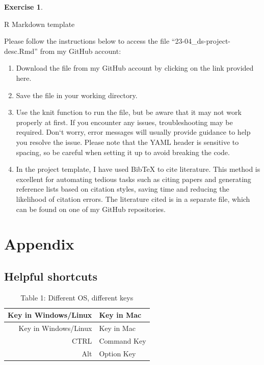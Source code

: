 \documentclass[
  12pt,
  oneside]{book}
\providecommand{\tightlist}{%
  \setlength{\itemsep}{0pt}\setlength{\parskip}{0pt}}
\theoremstyle{definition}
\theoremstyle{definition}
\theoremstyle{definition}
\newtheorem{exercise}{Exercise}[chapter]
\theoremstyle{definition}
\theoremstyle{remark}
\begin{document}
\begin{exercise}
\protect\hypertarget{exr:rmdsecond}{}\label{exr:rmdsecond}

R Markdown template

Please follow the instructions below to access the file ``23-04\_ds-project-desc.Rmd'' from my GitHub account:

\begin{enumerate}
\def\labelenumi{\arabic{enumi}.}
\tightlist
\item
  Download the file from my GitHub account by clicking on the link provided here.
\item
  Save the file in your working directory.
\item
  Use the knit function to run the file, but be aware that it may not work properly at first. If you encounter any issues, troubleshooting may be required. Don`t worry, error messages will usually provide guidance to help you resolve the issue. Please note that the YAML header is sensitive to spacing, so be careful when setting it up to avoid breaking the code.
\item
  In the project template, I have used BibTeX to cite literature. This method is excellent for automating tedious tasks such as citing papers and generating reference lists based on citation styles, saving time and reducing the likelihood of citation errors. The literature cited is in a separate file, which can be found on one of my GitHub repositories.
\end{enumerate}

\end{exercise}

\hypertarget{appendix}{%
\chapter{Appendix}\label{appendix}}

\hypertarget{helpful-shortcuts}{%
\section{Helpful shortcuts}\label{helpful-shortcuts}}

\begin{longtable}[]{@{}rl@{}}
\caption{Table 1: Different OS, different keys}\tabularnewline
\toprule\noalign{}
Key in Windows/Linux & Key in Mac \\
\midrule\noalign{}
\endfirsthead
\toprule\noalign{}
Key in Windows/Linux & Key in Mac \\
\midrule\noalign{}
\endhead
\bottomrule\noalign{}
\endlastfoot
CTRL & Command Key \\
Alt & Option Key \\
\end{longtable}
\end{document}
